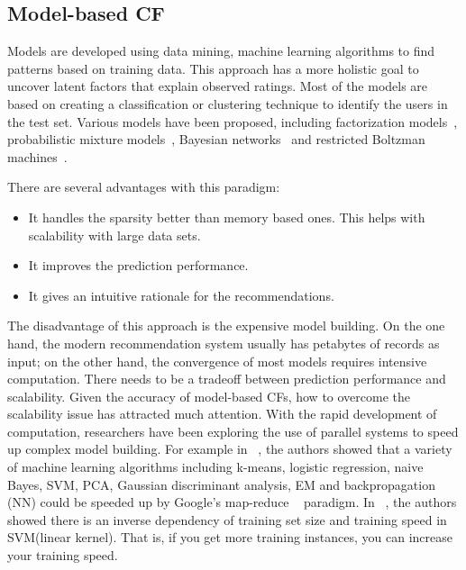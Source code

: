 \hspace{0.05in}
\subsection{Model-based CF}
Models are developed using data mining, machine learning algorithms to find patterns based on training data. This approach has a more holistic goal to uncover latent factors that explain observed ratings. Most of the models are based on creating a classification or clustering technique to identify the users in the test set.
Various models have been proposed, including factorization models~\cite{/computer/yehuda09matrix, /aaai/WPan12,paterek07,/tist/LibFM-TIST12},
probabilistic mixture models~\cite{hofmann04cf,jin:decoupled}, Bayesian networks~\cite{pennock00pd} and restricted Boltzman machines~\cite{/icml/SalakhutdinovMH07}.

There are several advantages with this paradigm:
\begin{itemize}
\item It handles the sparsity better than memory based ones. This helps with scalability with large data sets.
\item It improves the prediction performance.
\item It gives an intuitive rationale for the recommendations.
\end{itemize}

The disadvantage of this approach is the expensive model building. On the one hand, the modern recommendation system usually has petabytes of records as input; on the other hand, the convergence of most models requires intensive computation. There needs to be a tradeoff between prediction performance and scalability. Given the accuracy of model-based CFs, how to overcome the scalability issue has attracted much attention. With the rapid development of computation, researchers have been exploring the use of parallel systems to speed up complex model building. For example in ~\cite{chu2007map}, the authors showed that a variety of machine learning algorithms including k-means, logistic regression, naive Bayes, SVM, PCA, Gaussian discriminant analysis, EM and backpropagation (NN) could be speeded up by Google's map-reduce ~\cite{dean2008mapreduce} paradigm. In ~\cite{Shalev-Shwartz:2008:SOI:1390156.1390273}, the authors showed there is an inverse dependency of training set size and training speed in SVM(linear kernel). That is, if you get more training instances, you can increase your training speed.

